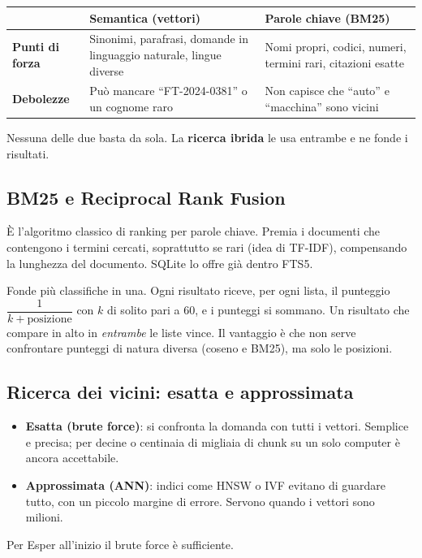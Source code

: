 \documentclass[11pt,a4paper]{article}
\newcommand{\hd}[1]{\textbf{\color{amber}#1}}
\newcommand{\tablehead}{\rowcolor{paper}}
\begin{document}
\begin{center}
\small
\begin{tabularx}{\textwidth}{@{}L{2.2cm}XX@{}}
\toprule
\tablehead & \hd{Semantica (vettori)} & \hd{Parole chiave (BM25)} \\
\midrule
\textbf{Punti di forza} & Sinonimi, parafrasi, domande in linguaggio naturale, lingue diverse & Nomi propri, codici, numeri, termini rari, citazioni esatte \\
\textbf{Debolezze} & Può mancare ``FT-2024-0381'' o un cognome raro & Non capisce che ``auto'' e ``macchina'' sono vicini \\
\bottomrule
\end{tabularx}
\end{center}

Nessuna delle due basta da sola. La \textbf{ricerca ibrida} le usa entrambe e ne fonde i risultati.

\subsection{BM25 e Reciprocal Rank Fusion}

\begin{description}[style=nextline,leftmargin=1em]
  \item[BM25] È l'algoritmo classico di ranking per parole chiave. Premia i documenti che contengono i termini cercati, soprattutto se rari (idea di TF-IDF), compensando la lunghezza del documento. SQLite lo offre già dentro FTS5.
  \item[Reciprocal Rank Fusion (RRF)] Fonde più classifiche in una. Ogni risultato riceve, per ogni lista, il punteggio $\dfrac{1}{k + \text{posizione}}$ con $k$ di solito pari a 60, e i punteggi si sommano. Un risultato che compare in alto in \emph{entrambe} le liste vince. Il vantaggio è che non serve confrontare punteggi di natura diversa (coseno e BM25), ma solo le posizioni.
\end{description}

\subsection{Ricerca dei vicini: esatta e approssimata}

\begin{itemize}
  \item \textbf{Esatta (brute force)}: si confronta la domanda con tutti i vettori. Semplice e precisa; per decine o centinaia di migliaia di chunk su un solo computer è ancora accettabile.
  \item \textbf{Approssimata (ANN)}: indici come HNSW o IVF evitano di guardare tutto, con un piccolo margine di errore. Servono quando i vettori sono milioni.
\end{itemize}
Per Esper all'inizio il brute force è sufficiente.
\end{document}
